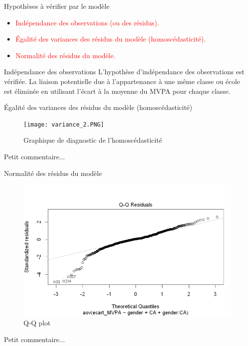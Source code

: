 \documentclass{beamer}
\begin{document}
	\begin{frame}{Hypothèses à vérifier par le modèle}
		\begin{itemize}
			\item \textcolor{red}{Indépendance des observations (ou des résidus).}
			\item \textcolor{red}{Égalité des variances des résidus du modèle (homoscédasticité).}
			\item \textcolor{red}{Normalité des résidus du modèle.}
		\end{itemize}
	\end{frame}
	
	\begin{frame}{Indépendance des observations}
		L'hypothèse d'indépendance des observations est vérifiée. La liaison potentielle due à l'appartenance à une même classe ou école est éliminée en utilisant l'écart à la moyenne du MVPA pour chaque classe.
	\end{frame}
	
	\begin{frame}{Égalité des variances des résidus du modèle (homoscédasticité)}
		\begin{figure}[H]
			\centering
			\texttt{[image: variance\_2.PNG]}
			\caption{Graphique de diagnostic de l'homoscédasticité}
			\label{fig:variance2}
		\end{figure}
		
		Petit commentaire...
	\end{frame}
	
	\begin{frame}{Normalité des résidus du modèle}
		\begin{figure}[H]
			\centering
			\includegraphics[width=0.8\linewidth]{Normalité_2.PNG}
			\caption{Q-Q plot}
			\label{fig:QQplot_2}
		\end{figure}
		Petit commentaire...
	\end{frame}
	
\end{document}
